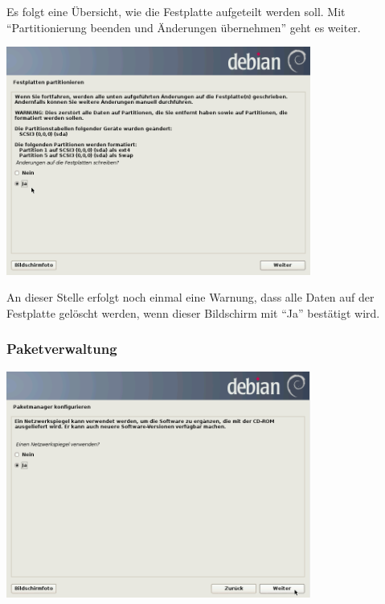 \documentclass[a4paper,12pt,twoside]{article}
\begin{document}
Es folgt eine Übersicht, wie die Festplatte aufgeteilt werden soll. Mit
"`Partitionierung beenden und Änderungen übernehmen"' geht es weiter.

\begin{minipage}{\linewidth}
    \centering
    \includegraphics[width=10cm]{efaLivede-img/efaLivede-img12.png}
    \label{fig:abfrage_partitionierung}
\end{minipage}

An dieser Stelle erfolgt noch einmal eine Warnung, dass alle Daten auf
der Festplatte gelöscht werden, wenn dieser Bildschirm mit
"`Ja"' bestätigt wird.

\subsubsection{Paketverwaltung}
\label{sct:paketverwaltung}

\begin{minipage}{\linewidth}
    \centering
    \includegraphics[width=10cm]{efaLivede-img/efaLivede-img13.png}
    \label{fig:abfrage_mirror}
\end{minipage}
\bigskip
\end{document}
